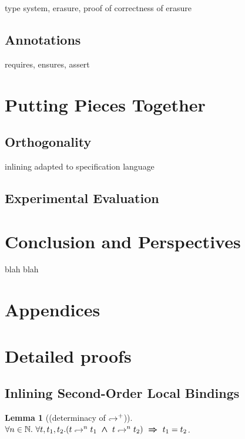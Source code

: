 \documentclass[a4paper,11pt,oneside]{article}
\theoremstyle{plain}
\newtheorem{lemma}[definition]{Lemma}
\newcommand{\bwedge}{\boldsymbol{~\wedge~}}
\newcommand{\brarr}{\boldsymbol{~\Rightarrow~}}
\newcommand{\hookdownarrow}{\mathrel{\rotatebox[origin=c]{180}{$\hookleftarrow$}}}
\newcommand{\inlletarr}{\hookdownarrow}
\newcommand{\inlletplus}{\hookdownarrow^{+}}
\begin{document}
type system, erasure, proof of correctness of erasure

\subsection{Annotations}

requires, ensures, assert

\section{Putting Pieces Together}

\subsection{Orthogonality}

inlining adapted to specification language

\subsection{Experimental Evaluation}

\section{Conclusion and Perspectives}

blah blah

\newpage
\section*{Appendices}
\newpage
\appendix


\section{Detailed proofs} 


	\subsection{Inlining Second-Order Local Bindings}
	

\begin{lemma}[(determinacy of $\inlletplus$)] 
	$\forall n \in \mathbb{N}.~ \forall t, t_1, t_2.
		(t \inlletarr^{n} {t_1} \bwedge t \inlletarr^{n} {t_2}) \brarr
			t_1 = t_2$.	
	\label{inllet-determ-p}	
\end{lemma}
\end{document}

